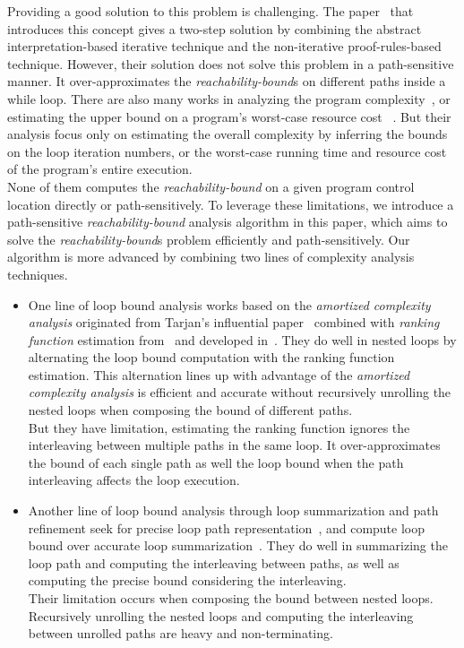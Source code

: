 Providing a good solution to this problem is challenging.
The paper~\cite{GulwaniZ10} that introduces this concept
gives a two-step solution by combining the abstract interpretation-based iterative technique
 and the non-iterative proof-rules-based technique.
 However, their solution
does not solve this problem in a path-sensitive manner.
It over-approximates the \emph{reachability-bound}s on different paths inside a while loop.
 There are also many works in analyzing the program complexity~\cite{GustafssonEL05, HumenbergerJK18},
 or estimating the upper bound on a program's worst-case resource cost
~\cite{BrockschmidtEFFG16, AlbertAGP08, AliasDFG10, Flores-MontoyaH14}.
But their analysis
focus only on estimating 
the overall complexity 
by inferring the bounds on the loop iteration numbers,
 or the worst-case running time and resource cost of the program's entire execution.
 \\
 None of them computes the \emph{reachability-bound} on a given program control location directly or path-sensitively.
 To leverage these limitations,
we introduce a path-sensitive \emph{reachability-bound} analysis algorithm in this paper, which aims to solve 
the \emph{reachability-bound}s problem efficiently and path-sensitively.
Our algorithm is more advanced by combining two lines of complexity analysis techniques.
 \begin{itemize}
 \item One line of loop bound analysis works based on the \emph{amortized complexity analysis} originated from Tarjan's influential paper~\cite{PotechinP17} combined with \emph{ranking function} estimation from~\cite{BradleyMS05} and developed in~\cite{ZulegerGSV11,SinnZV14,SinnZV17,LuCT21,AliasDFG10}.
 They do well in nested loops by alternating the loop bound computation with the ranking function estimation. This alternation lines up with advantage of the \emph{amortized complexity analysis} is efficient and accurate without recursively unrolling the nested loops when composing the bound of different paths.
 \\
But they have limitation, estimating the ranking function ignores the interleaving between multiple paths in the same loop.
It over-approximates the bound of each single path as well the loop bound when the path interleaving affects the loop execution.
\item 
Another line of loop bound analysis through loop summarization and path refinement seek for precise loop path representation~\cite{ManoliosV06, BalakrishnanSIG09, SharmaDDA11, Flores-MontoyaH14, HumenbergerJK18, CyphertBKR19}, and compute loop bound over accurate loop summarization~\cite{GulwaniJK09, ZulegerGSV11}.
They do well in summarizing the loop path and computing the interleaving between paths, as well as computing the precise bound considering the interleaving.
\\
Their limitation occurs when composing the bound between nested loops. Recursively unrolling the nested loops and computing the interleaving between unrolled paths are heavy and non-terminating.
 \end{itemize}
